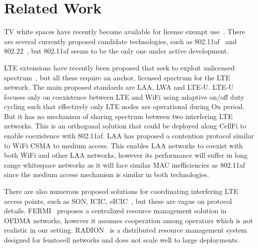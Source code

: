 \section{Related Work}

TV white spaces have recently become available for license exempt use~\cite{fcc, etsi_tvws}. 
There are several currently proposed candidate technologies, such as 802.11af~\cite{Rice_af} and 802.22~\cite{wifi80222}, 
but 802.11af seems to be the only one under active development. 

LTE extensions have recently been proposed that seek to exploit unlicensed spectrum~\cite{qualcomm-lte-unlicensed,huawei-lte-unlicensed,ericsson-unlicensed}, but all these require an anchor, licensed spectrum for the LTE network.
The main proposed standards are LAA, LWA and LTE-U. 
LTE-U focuses only on coexistence between LTE and WiFi using adaptive on/off duty cycling such that effectively only LTE nodes are operational during On period. But it has no mechanism of sharing spectrum between two interfering LTE networks.
This is an orthogonal solution that could be deployed along CellFi to enable coexistence with 802.11af.
LAA has proposed a contention protocol similar to WiFi CSMA to medium access. This enables LAA networks to coexist with both WiFi and other LAA networks, however its performance will suffer in long range whitespace networks as it will face similar MAC inefficiencies as 802.11af since the medium access mechanism is similar in both technologies.


There are also numerous proposed solutions for coordinating interfering LTE access points, such as SON, ICIC, eICIC~\cite{smallcellbook}, 
but these are vague on protocol details. 
FERMI~\cite{fermi} proposes a centralized resource management solution in OFDMA networks, however it assumes cooperation among operators which is not realistic in our setting.
RADION~\cite{radion} is a distributed resource management system designed for femtocell networks and does not scale well to large deployments.


